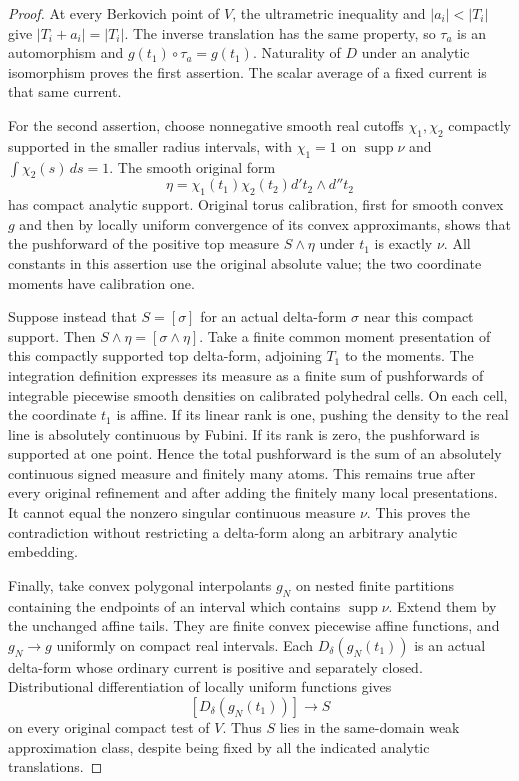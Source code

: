 \documentclass[11pt,a4paper]{article}
\numberwithin{equation}{section}
\theoremstyle{definition}
\theoremstyle{remark}
\begin{document}
\begin{proof}
At every Berkovich point of $V$, the ultrametric inequality and
$|a_i|<|T_i|$ give $|T_i+a_i|=|T_i|$. The inverse translation has
the same property, so $\tau_a$ is an automorphism and
$g(t_1)\circ\tau_a=g(t_1)$. Naturality of $D$ under an analytic
isomorphism proves the first assertion. The scalar average of a fixed
current is that same current.

For the second assertion, choose nonnegative smooth real cutoffs
$\chi_1,\chi_2$ compactly supported in the smaller radius intervals,
with $\chi_1=1$ on $\operatorname{supp}\nu$ and
$\int\chi_2(s)\,ds=1$. The smooth original form
\[
                \eta=\chi_1(t_1)\chi_2(t_2)
                       d't_2\wedge d''t_2
\]
has compact analytic support. Original torus calibration, first for
smooth convex $g$ and then by locally uniform convergence of its
convex approximants, shows that the pushforward of the positive top
measure $S\wedge\eta$ under $t_1$ is exactly $\nu$.
All constants in this assertion use the original absolute value; the
two coordinate moments have calibration one.

Suppose instead that $S=[\sigma]$ for an actual delta-form $\sigma$
near this compact support. Then $S\wedge\eta=[\sigma\wedge\eta]$.
Take a finite common moment presentation of this compactly supported
top delta-form, adjoining $T_1$ to the moments. The integration
definition expresses its measure as a finite sum of pushforwards of
integrable piecewise smooth densities on calibrated polyhedral cells.
On each cell, the coordinate $t_1$ is affine. If its linear rank is
one, pushing the density to the real line is absolutely continuous
by Fubini. If its rank is zero, the pushforward is supported at one
point. Hence the total pushforward is the sum of an absolutely
continuous signed measure and finitely many atoms. This remains true
after every original refinement and after adding the finitely many
local presentations. It cannot equal the nonzero singular continuous
measure $\nu$. This proves the contradiction without restricting a
delta-form along an arbitrary analytic embedding.

Finally, take convex polygonal interpolants $g_N$ on nested finite
partitions containing the endpoints of an interval which contains
$\operatorname{supp}\nu$. Extend them by the unchanged affine tails.
They are finite convex piecewise affine functions, and $g_N\to g$
uniformly on compact real intervals. Each
$D_\delta(g_N(t_1))$ is an actual delta-form whose ordinary current
is positive and separately closed. Distributional differentiation
of locally uniform functions gives
\[
                     [D_\delta(g_N(t_1))]\longrightarrow S
\]
on every original compact test of $V$. Thus $S$ lies in the same-domain
weak approximation class, despite being fixed by all the indicated
analytic translations.
\end{proof}
\end{document}
